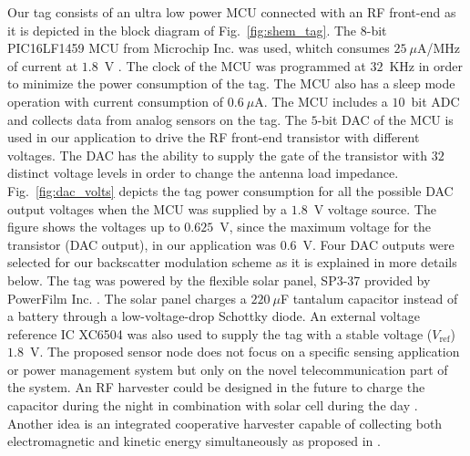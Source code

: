 \documentclass[journal]{IEEEtran}
\begin{document}
%
Our tag consists of an  ultra low power MCU connected with an RF front-end as it is  depicted in the block diagram of Fig.~\ref{fig:shem_tag}.
%
The $8$-bit PIC16LF1459 MCU from Microchip Inc. was used, whitch   consumes $25~\mu$A/MHz of current at $1.8$~V \cite{PIC16LF1459}. 
%
The clock of the MCU was programmed at $32$~KHz in order to minimize the power consumption of the tag.  
%
The MCU also has a sleep mode operation with current consumption of $0.6~\mu$A.
%
The MCU includes a $10$~bit  ADC  and collects data from analog sensors on the tag. 
%
%
The $5$-bit DAC of the MCU is used in our application  to drive the RF front-end transistor with different voltages. 
%
The DAC has the ability to supply the gate of the transistor with  $32$
distinct voltage levels in order to change the antenna load impedance.
%
Fig.~\ref{fig:dac_volts} depicts the tag power consumption for all the possible 
DAC output voltages when the MCU was supplied by a $1.8$~V voltage source.
%
The figure shows the voltages up to $0.625$~V, since the maximum voltage for the transistor (DAC output), in our application was $0.6$~V.
%
Four DAC outputs were selected for our backscatter modulation scheme as it is explained in more details below.
%
The tag was powered by the flexible solar panel, SP3-37 provided
by PowerFilm Inc. \cite{SP3-37}.  
%
The solar panel charges a $220~\mu$F  tantalum capacitor instead of a battery through a low-voltage-drop Schottky diode.
%
An external voltage reference IC XC6504 \cite{XC6504}  was also used  to supply the tag with a stable voltage ($V_\text{ref}$) $1.8$~V.
%
The proposed sensor node does not focus on a specific  sensing application  or power management system but only on the novel telecommunication part of the system. 
%
An  RF harvester could be designed in the future \cite{assimonis2014efficient} to charge the capacitor during the night in combination with solar cell during the day \cite{niotaki2014solar}.
%
Another idea is an integrated cooperative harvester capable of collecting both electromagnetic 
and kinetic energy simultaneously as proposed in
\cite{gu2018integrated}.
\end{document}
